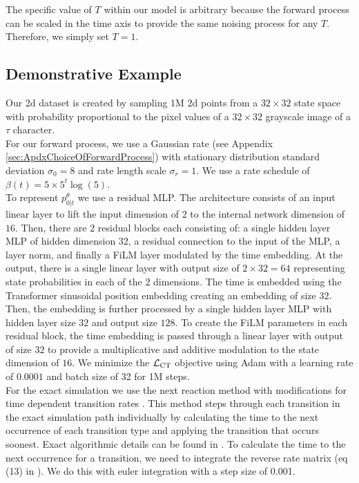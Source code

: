 \documentclass{article}
\begin{document}
The specific value of $T$ within our model is arbitrary because the forward process can be scaled in the time axis to provide the same noising process for any $T$. Therefore, we simply set $T=1$.
\subsection{Demonstrative Example} \label{sec:ApdxToyExperiment}
Our 2d dataset is created by sampling 1M 2d points from a $32 \times 32$ state space with probability proportional to the pixel values of a $32 \times 32$ grayscale image of a $\tau$ character.\\

For our forward process, we use a Gaussian rate (see Appendix \ref{sec:ApdxChoiceOfForwardProcess}) with stationary distribution standard deviation $\sigma_0 = 8$ and rate length scale $\sigma_r = 1$. We use a rate schedule of $\beta(t) = 5 \times 5^t \log (5) $.\\

To represent $p_{0|t}^\theta$ we use a residual MLP. The architecture consists of an input linear layer to lift the input dimension of $2$ to the internal network dimension of $16$. Then, there are $2$ residual blocks each consisting of: a single hidden layer MLP of hidden dimension $32$, a residual connection to the input of the MLP, a layer norm, and finally a FiLM layer \cite{perez2018film} modulated by the time embedding. At the output, there is a single linear layer with output size of $2 \times 32 = 64$ representing state probabilities in each of the $2$ dimensions. The time is embedded using the Transformer sinusoidal position embedding \cite{vaswani2017attention} creating an embedding of size $32$. Then, the embedding is further processed by a single hidden layer MLP with hidden layer size $32$ and output size $128$. To create the FiLM parameters in each residual block, the time embedding is passed through a linear layer with output of size $32$ to provide a multiplicative and additive modulation to the state dimension of $16$. We minimize the $\mathcal{L}_{\textup{CT}}$ objective using Adam with a learning rate of $0.0001$ and batch size of 32 for 1M steps.\\

For the exact simulation we use the next reaction method with modifications for time dependent transition rates \cite{anderson2007modified}. This method steps through each transition in the exact simulation path individually by calculating the time to the next occurrence of each transition type and applying the transition that occurs soonest. Exact algorithmic details can be found in \cite{anderson2007modified}. To calculate the time to the next occurrence for a transition, we need to integrate the reverse rate matrix (eq (13) in \cite{anderson2007modified}). We do this with euler integration with a step size of 0.001.
\end{document}
